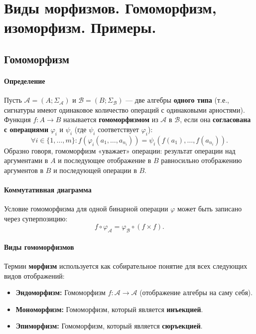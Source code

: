 \section{Виды морфизмов. Гомоморфизм, изоморфизм. Примеры.}


\subsection*{Гомоморфизм}

\paragraph{Определение}
Пусть $\mathcal{A} = (A; \Sigma_\mathcal{A})$ и $\mathcal{B} = (B; \Sigma_\mathcal{B})$ --- две алгебры \textbf{одного типа} (т.е., сигнатуры имеют одинаковое количество операций с одинаковыми арностями).
Функция $f: A \to B$ называется \textbf{гомоморфизмом} из $\mathcal{A}$ в $\mathcal{B}$, если она \textbf{согласована с операциями} $\varphi_i$ и $\psi_i$ (где $\psi_i$ соответствует $\varphi_i$):
$$\forall i \in \{1, \ldots, m\}: f(\varphi_i(a_1, \ldots, a_{n_i})) = \psi_i(f(a_1), \ldots, f(a_{n_i})).$$
Образно говоря, гомоморфизм «уважает» операции: результат операции над аргументами в $A$ и последующее отображение в $B$ равносильно отображению аргументов в $B$ и последующей операции в $B$.

\paragraph{Коммутативная диаграмма}
Условие гомоморфизма для одной бинарной операции $\varphi$ может быть записано через суперпозицию:
$$f \circ \varphi_\mathcal{A} = \varphi_\mathcal{B} \circ (f \times f).$$

\paragraph{Виды гомоморфизмов}
Термин \textbf{морфизм} используется как собирательное понятие для всех следующих видов отображений:
\begin{itemize}
    \item \textbf{Эндоморфизм:} Гомоморфизм $f: \mathcal{A} \to \mathcal{A}$ (отображение алгебры на саму себя).
    \item \textbf{Мономорфизм:} Гомоморфизм, который является \textbf{инъекцией}.
    \item \textbf{Эпиморфизм:} Гомоморфизм, который является \textbf{сюръекцией}.
\end{itemize}

